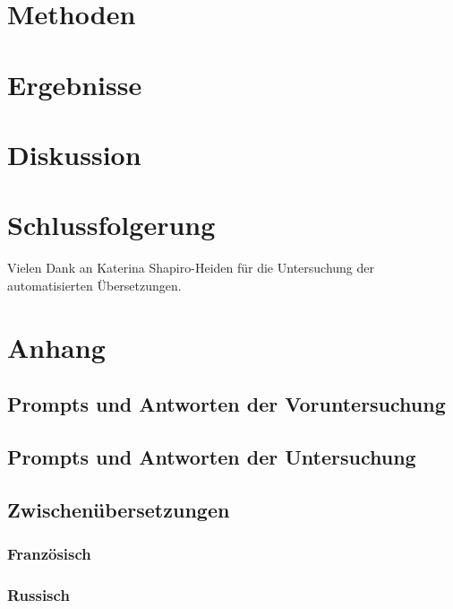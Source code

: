 \documentclass[acmlarge,authorversion,nonacm]{acmart}
\begin{document}
\section{Methoden}\label{sec:methods}


\section{Ergebnisse}\label{sec:results}


\section{Diskussion}\label{sec:discussion}


\section{Schlussfolgerung}\label{sec:conclusion}


\begin{acks}
Vielen Dank an Katerina Shapiro-Heiden für die Untersuchung der automatisierten Übersetzungen.
\end{acks}




\newpage
\appendix

\section{Anhang}

\subsection{Prompts und Antworten der Voruntersuchung}


\subsection{Prompts und Antworten der Untersuchung}

\subsection{Zwischenübersetzungen}

\subsubsection{Französisch}

\subsubsection{Russisch}
\end{document}
